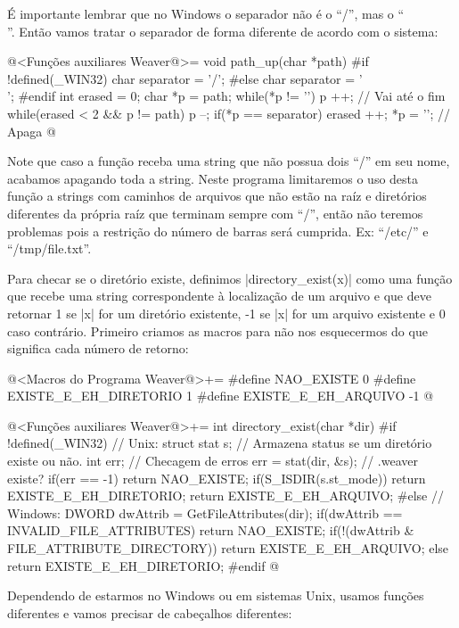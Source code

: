 É importante lembrar que no Windows o separador não é o ``/'', mas o
``\\''. Então vamos tratar o separador de forma diferente de acordo
com o sistema:

\iniciocodigo
@<Funções auxiliares Weaver@>=
void path_up(char *path){
#if !defined(_WIN32)
  char separator = '/';
#else
  char separator = '\\';
#endif
  int erased = 0;
  char *p = path;
  while(*p != '\0') p ++; // Vai até o fim
  while(erased < 2 && p != path){
    p --;
    if(*p == separator) erased ++;
    *p = '\0'; // Apaga
  }
}
@
\fimcodigo

Note que caso a função receba uma string que não possua dois ``/'' em
seu nome, acabamos apagando toda a string. Neste programa limitaremos
o uso desta função a strings com caminhos de arquivos que não estão na
raíz e diretórios diferentes da própria raíz que terminam sempre com
``/'', então não teremos problemas pois a restrição do número de
barras será cumprida. Ex: ``/etc/'' e ``/tmp/file.txt''.


Para checar se o diretório  existe, definimos
|directory_exist(x)| como uma função que recebe uma string
correspondente à localização de um arquivo e que deve retornar 1 se
|x| for um diretório existente, -1 se |x| for um arquivo existente e 0
caso contrário. Primeiro criamos as macros para não nos esquecermos do
que significa cada número de retorno:

\iniciocodigo
@<Macros do Programa Weaver@>+=
#define NAO_EXISTE             0
#define EXISTE_E_EH_DIRETORIO  1
#define EXISTE_E_EH_ARQUIVO   -1
@
\fimcodigo

\iniciocodigo
@<Funções auxiliares Weaver@>+=
int directory_exist(char *dir){
#if !defined(_WIN32)
  // Unix:
  struct stat s; // Armazena status se um diretório existe ou não.
  int err; // Checagem de erros
  err = stat(dir, &s); // .weaver existe?
  if(err == -1) return NAO_EXISTE;
  if(S_ISDIR(s.st_mode)) return EXISTE_E_EH_DIRETORIO;
  return EXISTE_E_EH_ARQUIVO;
#else
  // Windows:
  DWORD dwAttrib = GetFileAttributes(dir);
  if(dwAttrib == INVALID_FILE_ATTRIBUTES) return NAO_EXISTE;
  if(!(dwAttrib & FILE_ATTRIBUTE_DIRECTORY)) return EXISTE_E_EH_ARQUIVO;
  else return EXISTE_E_EH_DIRETORIO;
#endif
}
@
\fimcodigo

Dependendo de estarmos no Windows ou em sistemas Unix, usamos funções
diferentes e vamos precisar de cabeçalhos diferentes:

